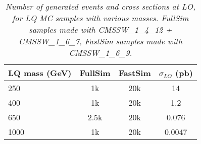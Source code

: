 %
\begin{table}[htb]
  \label{tab:NumEvents}
  \begin{center}
    \begin{tabular}{|l|ccc|} \hline
      LQ mass (GeV) & FullSim & FastSim & $\sigma_{LO}$ (pb) \\ \hline
      250  & 1k  &  20k & 14 \\
      400  & 1k  &  20k & 1.2 \\
      650  & 2.5k &  20k & 0.076 \\
      1000 & 1k  &  20k & 0.0047 \\
      \hline
    \end{tabular}
    \caption{\small \sl Number of generated events and cross sections at LO, for LQ MC samples with various masses.  
      FullSim samples made with CMSSW\_1\_4\_12 + CMSSW\_1\_6\_7, FastSim samples made with CMSSW\_1\_6\_9.}
  \end{center}
\end{table}

 


